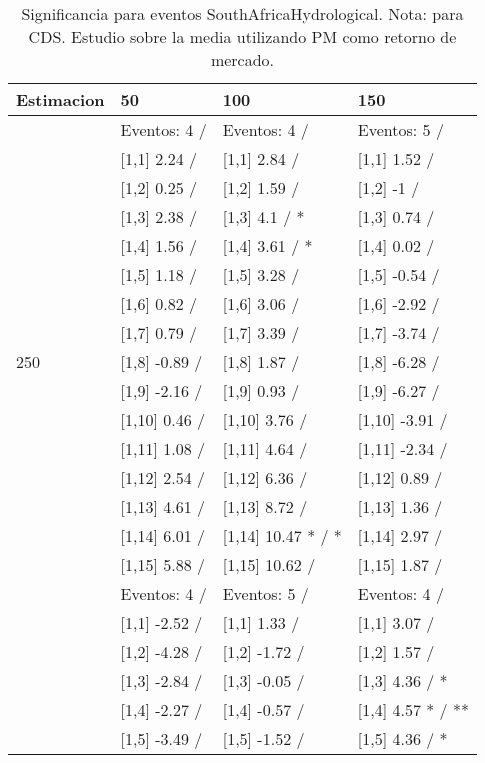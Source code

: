 \begin{table}

\caption{Significancia para eventos SouthAfricaHydrological. Nota: para CDS. Estudio sobre la media utilizando PM como retorno de mercado.}
\centering
\begin{tabular}[t]{llll}
\toprule
Estimacion & 50 & 100 & 150\\
\midrule
 & Eventos:  4 / & Eventos:  4 / & Eventos:  5 /\\
 & {}[1,1] 2.24  / & {}[1,1] 2.84  / & {}[1,1] 1.52  /\\
 & {}[1,2] 0.25  / & {}[1,2] 1.59  / & {}[1,2] -1  /\\
 & {}[1,3] 2.38  / & {}[1,3] 4.1  / * & {}[1,3] 0.74  /\\
 & {}[1,4] 1.56  / & {}[1,4] 3.61  / * & {}[1,4] 0.02  /\\
\addlinespace
 & {}[1,5] 1.18  / & {}[1,5] 3.28  / & {}[1,5] -0.54  /\\
 & {}[1,6] 0.82  / & {}[1,6] 3.06  / & {}[1,6] -2.92  /\\
 & {}[1,7] 0.79  / & {}[1,7] 3.39  / & {}[1,7] -3.74  /\\
250 & {}[1,8] -0.89  / & {}[1,8] 1.87  / & {}[1,8] -6.28  /\\
 & {}[1,9] -2.16  / & {}[1,9] 0.93  / & {}[1,9] -6.27  /\\
\addlinespace
 & {}[1,10] 0.46  / & {}[1,10] 3.76  / & {}[1,10] -3.91  /\\
 & {}[1,11] 1.08  / & {}[1,11] 4.64  / & {}[1,11] -2.34  /\\
 & {}[1,12] 2.54  / & {}[1,12] 6.36  / & {}[1,12] 0.89  /\\
 & {}[1,13] 4.61  / & {}[1,13] 8.72  / & {}[1,13] 1.36  /\\
 & {}[1,14] 6.01  / & {}[1,14] 10.47 * / * & {}[1,14] 2.97  /\\
\addlinespace
 & {}[1,15] 5.88  / & {}[1,15] 10.62  / & {}[1,15] 1.87  /\\
 & Eventos:  4 / & Eventos:  5 / & Eventos:  4 /\\
 & {}[1,1] -2.52  / & {}[1,1] 1.33  / & {}[1,1] 3.07  /\\
 & {}[1,2] -4.28  / & {}[1,2] -1.72  / & {}[1,2] 1.57  /\\
 & {}[1,3] -2.84  / & {}[1,3] -0.05  / & {}[1,3] 4.36  / *\\
\addlinespace
 & {}[1,4] -2.27  / & {}[1,4] -0.57  / & {}[1,4] 4.57 * / **\\
 & {}[1,5] -3.49  / & {}[1,5] -1.52  / & {}[1,5] 4.36  / *\\

\end{tabular}
\end{table}
